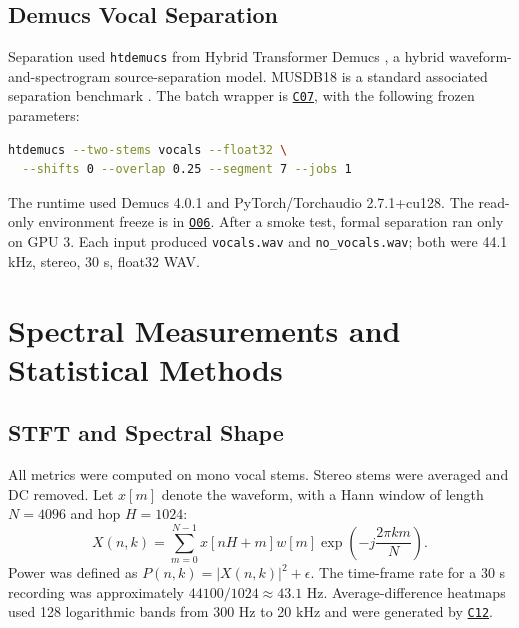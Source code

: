 \documentclass[11pt,a4paper]{article}
\newcommand{\coderef}[1]{\hyperlink{code:#1}{\texttt{#1}}}
\newcommand{\outref}[1]{\hyperlink{output:#1}{\texttt{#1}}}
\begin{document}
\subsection{Demucs Vocal Separation}

Separation used \texttt{htdemucs} from Hybrid Transformer Demucs \citep{demucs2021}, a hybrid waveform-and-spectrogram source-separation model. MUSDB18 is a standard associated separation benchmark \citep{musdb18}. The batch wrapper is \coderef{C07}, with the following frozen parameters:

\begin{lstlisting}[language=bash,caption={Frozen Demucs vocal-only parameters.}]
htdemucs --two-stems vocals --float32 \
  --shifts 0 --overlap 0.25 --segment 7 --jobs 1
\end{lstlisting}

The runtime used Demucs 4.0.1 and PyTorch/Torchaudio 2.7.1+cu128. The read-only environment freeze is in \outref{O06}. After a smoke test, formal separation ran only on GPU 3. Each input produced \texttt{vocals.wav} and \texttt{no\_vocals.wav}; both were 44.1 kHz, stereo, 30 s, float32 WAV.

\section{Spectral Measurements and Statistical Methods}
\label{sec:method}

\subsection{STFT and Spectral Shape}

All metrics were computed on mono vocal stems. Stereo stems were averaged and DC removed. Let $x[m]$ denote the waveform, with a Hann window of length $N=4096$ and hop $H=1024$:
\begin{equation}
X(n,k)=\sum_{m=0}^{N-1}x[nH+m]w[m]\exp\!\left(-j\frac{2\pi km}{N}\right).
\label{eq:stft}
\end{equation}
Power was defined as $P(n,k)=|X(n,k)|^2+\epsilon$. The time-frame rate for a 30 s recording was approximately $44100/1024\approx43.1$ Hz. Average-difference heatmaps used 128 logarithmic bands from 300 Hz to 20 kHz and were generated by \coderef{C12}.
\end{document}
